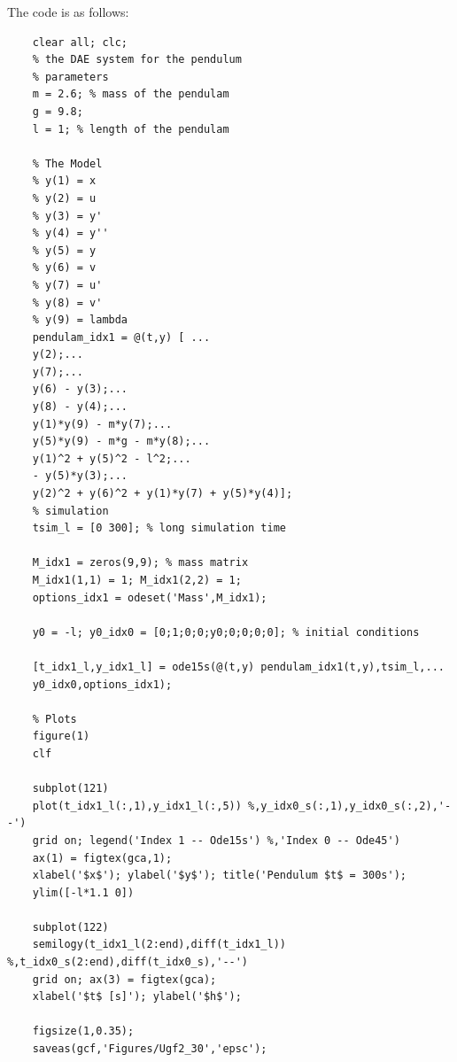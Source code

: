 The code is as follows:
\begin{lstlisting}
	clear all; clc; 
	% the DAE system for the pendulum
	% parameters
	m = 2.6; % mass of the pendulam
	g = 9.8; 
	l = 1; % length of the pendulam
	
	% The Model
	% y(1) = x
	% y(2) = u
	% y(3) = y'
	% y(4) = y''
	% y(5) = y
	% y(6) = v
	% y(7) = u'
	% y(8) = v'
	% y(9) = lambda
	pendulam_idx1 = @(t,y) [ ...
	y(2);...
	y(7);...
	y(6) - y(3);...
	y(8) - y(4);...
	y(1)*y(9) - m*y(7);...
	y(5)*y(9) - m*g - m*y(8);...
	y(1)^2 + y(5)^2 - l^2;...
	- y(5)*y(3);...
	y(2)^2 + y(6)^2 + y(1)*y(7) + y(5)*y(4)]; 
	% simulation 
	tsim_l = [0 300]; % long simulation time
	
	M_idx1 = zeros(9,9); % mass matrix
	M_idx1(1,1) = 1; M_idx1(2,2) = 1; 
	options_idx1 = odeset('Mass',M_idx1); 
	
	y0 = -l; y0_idx0 = [0;1;0;0;y0;0;0;0;0]; % initial conditions
	
	[t_idx1_l,y_idx1_l] = ode15s(@(t,y) pendulam_idx1(t,y),tsim_l,...
	y0_idx0,options_idx1);
	
	% Plots
	figure(1)
	clf
	
	subplot(121)
	plot(t_idx1_l(:,1),y_idx1_l(:,5)) %,y_idx0_s(:,1),y_idx0_s(:,2),'--')
	grid on; legend('Index 1 -- Ode15s') %,'Index 0 -- Ode45')
	ax(1) = figtex(gca,1);
	xlabel('$x$'); ylabel('$y$'); title('Pendulum $t$ = 300s');
	ylim([-l*1.1 0])
	
	subplot(122)
	semilogy(t_idx1_l(2:end),diff(t_idx1_l)) %,t_idx0_s(2:end),diff(t_idx0_s),'--')
	grid on; ax(3) = figtex(gca);
	xlabel('$t$ [s]'); ylabel('$h$');
	
	figsize(1,0.35);
	saveas(gcf,'Figures/Ugf2_30','epsc');		
\end{lstlisting}